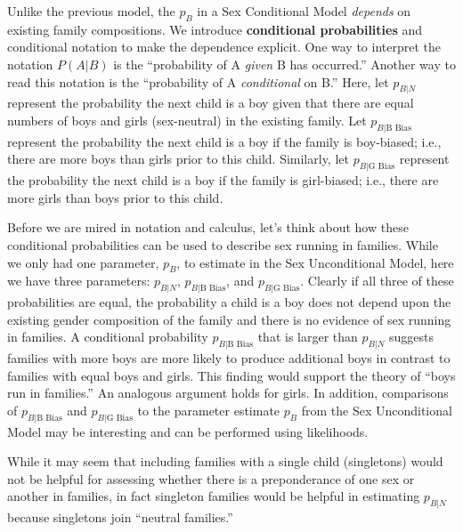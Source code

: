 \documentclass[
]{krantz}
\newcommand{\neutral}{p_{B|N}}
\newcommand{\gbias}{p_{B|\textrm{G Bias}}}
\newcommand{\bbias}{p_{B|\textrm{B Bias}}}
\begin{document}
Unlike the previous model, the \(p_B\) in a Sex Conditional Model \emph{depends} on existing family compositions. We introduce \textbf{conditional probabilities}  and conditional notation to make the dependence explicit. One way to interpret the notation \(P(A|B)\) is the ``probability of A \emph{given} B has occurred.'' Another way to read this notation is the ``probability of A \emph{conditional} on B.'' Here, let \(\neutral\) represent the probability the next child is a boy given that there are equal numbers of boys and girls (sex-neutral) in the existing family. Let \(\bbias\) represent the probability the next child is a boy if the family is boy-biased; i.e., there are more boys than girls prior to this child. Similarly, let \(\gbias\) represent the probability the next child is a boy if the family is girl-biased; i.e., there are more girls than boys prior to this child.

Before we are mired in notation and calculus, let's think about how these conditional probabilities can be used to describe sex running in families. While we only had one parameter, \(p_B\), to estimate in the Sex Unconditional Model, here we have three parameters: \(\neutral\), \(\bbias\), and \(\gbias\). Clearly if all three of these probabilities are equal, the probability a child is a boy does not depend upon the existing gender composition of the family and there is no evidence of sex running in families. A conditional probability \(\bbias\) that is larger than \(\neutral\) suggests families with more boys are more likely to produce additional boys in contrast to families with equal boys and girls. This finding would support the theory of ``boys run in families.'' An analogous argument holds for girls. In addition, comparisons of \(\bbias\) and \(\gbias\) to the parameter estimate \(p_B\) from the Sex Unconditional Model may be interesting and can be performed using likelihoods.

While it may seem that including families with a single child (singletons) would not be helpful for assessing whether there is a preponderance of one sex or another in families, in fact singleton families would be helpful in estimating \(\neutral\) because singletons join ``neutral families.''
\end{document}
